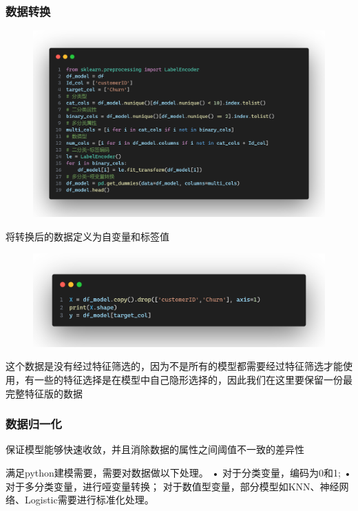 \documentclass{article}
\begin{document}
\subsubsection{数据转换}

\begin{figure}[H]
	\centering
	\includegraphics[width=\textwidth]{./img/data_transform.png}
\end{figure}

将转换后的数据定义为自变量和标签值

\begin{figure}[H]
	\centering
	\includegraphics[width=\textwidth]{./img/x_y.png}
\end{figure}
这个数据是没有经过特征筛选的，因为不是所有的模型都需要经过特征筛选才能使用，有一些的特征选择是在模型中自己隐形选择的，因此我们在这里要保留一份最完整特征版的数据

\subsubsection{数据归一化}
保证模型能够快速收敛，并且消除数据的属性之间阈值不一致的差异性

满足python建模需要，需要对数据做以下处理。
•	对于分类变量，编码为0和1;
•	对于多分类变量，进行哑变量转换；
对于数值型变量，部分模型如KNN、神经网络、Logistic需要进行标准化处理。
\end{document}
